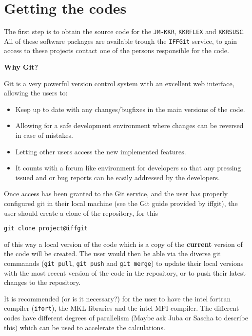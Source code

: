 \documentclass[11pt,fleqn]{book} %
\begin{document}
\section{Getting the codes}
\label{sec:getcode}
The first step is to obtain the source code for the \verb;JM-KKR;, \verb;KKRFLEX; and \verb;KKRSUSC;. All of these software packages are available trough the \verb;IFFGit; service, to gain access to these projects contact one of the persons responsible for the code. 
\begin{fBox}
{\Large{\textbf{\sffamily\textcolor{FZJTeal}{Why Git?}}}}

Git is a very powerful version control system with an excellent web interface, allowing the users to: 
\begin{itemize}
\item Keep up to date with any changes/bugfixes in the main versions of the code.
\item Allowing for a safe development environment where changes can be reversed in case of mistakes.
\item Letting other users access the new implemented features.
\item It counts with a forum like environment for developers so that any pressing issued and or bug reports can be easily addressed by the developers.
\end{itemize}
\end{fBox}
Once access has been granted to the Git service, and the user has properly configured git in their local machine (see the Git guide provided by iffgit), the user should create a clone of the repository, for this

\begin{VBox}
\begin{verbatim}
git clone project@iffgit 
\end{verbatim}
\end{VBox}

\noindent of this way a local version of the code which is a copy of the \textbf{current} version of the code will be created. The user would then be able via the diverse git commannds (\verb;git pull;, \verb;git push; and \verb;git merge;) to update their local versions with the most recent version of the code in the repository, or to push their latest changes to the repository.

It is recommended (or is it necessary?) for the user to have the intel fortran compiler (\verb;ifort;), the MKL libraries and the intel MPI compiler. The different codes have different degrees of parallelism (Maybe ask Juba or Sascha to describe this) which can be used to accelerate the calculations.
\end{document}
